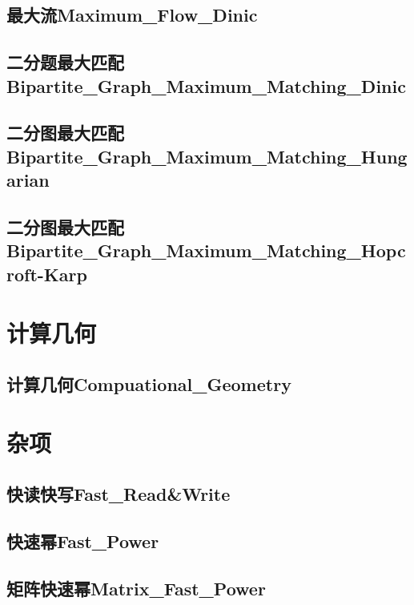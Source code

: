 \documentclass[10pt,a4paper]{article}
\begin{document}
\subsection{最大流Maximum\_Flow\_Dinic}

\subsection{二分题最大匹配Bipartite\_Graph\_Maximum\_Matching\_Dinic}

\subsection{二分图最大匹配Bipartite\_Graph\_Maximum\_Matching\_Hungarian}

\subsection{二分图最大匹配Bipartite\_Graph\_Maximum\_Matching\_Hopcroft-Karp}


\newpage
\section{计算几何}
\subsection{计算几何Compuational\_Geometry}


\newpage
\section{杂项}
\subsection{快读快写Fast\_Read\&Write}

\subsection{快速幂Fast\_Power}

\subsection{矩阵快速幂Matrix\_Fast\_Power}

\end{document}
